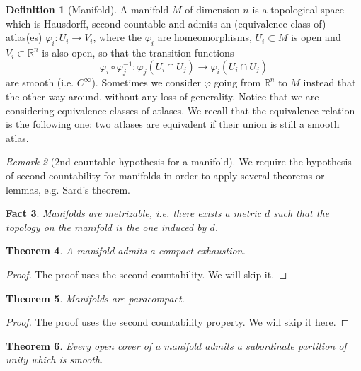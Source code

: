 \documentclass[a4paper,11pt,titlepage, article, oneside]{memoir}
\numberwithin{equation}{section}
\newtheorem{theorem}{Theorem}[section]
\newtheorem{fact}[theorem]{Fact}
\theoremstyle{definition}
\newtheorem{definition}[theorem]{Definition}
\theoremstyle{remark}
\newtheorem{remark}[theorem]{Remark}
\newcommand{\rfield}{\mathbb{R}}
\begin{document}
\begin{definition}[Manifold]
A manifold $M$ of dimension $n$ is a topological space which is Hausdorff, second countable and admits an (equivalence class of) atlas(es) $\varphi_i \colon U_i \rightarrow V_i$, where the
$\varphi_i$ are homeomorphisms, $U_i \subset M$ is open and $V_i \subset \rfield^n$ is also open, so that the transition functions
$$\varphi_i \circ \varphi_j^{-1} \colon \varphi_j(U_i \cap U_j) \rightarrow \varphi_i (U_i \cap U_j)$$ are smooth (i.e. $C^{\infty}$). Sometimes we consider $\varphi$ going from $\rfield^n$ to $M$ instead that the other way around, without any loss of generality. Notice that we are considering equivalence classes of atlases. We recall that the equivalence relation is the following one: two atlases are equivalent if their union is still a smooth atlas.
\end{definition}

\begin{remarkbox} \begin{remark}[2nd countable hypothesis for a manifold]
We require the hypothesis of second countability for manifolds in order to apply several theorems or lemmas, e.g. Sard's theorem.
\end{remark} \end{remarkbox}

\begin{fact}
Manifolds are metrizable, i.e. there exists a metric $d$ such that the topology on the manifold is the one induced by $d$.
\end{fact}


\begin{theorem}
A manifold admits a compact exhaustion.
\end{theorem}
\begin{proof}
The proof uses the second countability. We will skip it.
\end{proof}


\begin{theorem} \label{paracompactnessthm}
Manifolds are paracompact.
\end{theorem}
\begin{proof}
The proof uses the second countability property. We will skip it here.
\end{proof}



\begin{theorem}
Every open cover of a manifold admits a subordinate partition of unity which is smooth.
\end{theorem}
\end{document}
